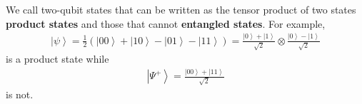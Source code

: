 \documentclass[11pt]{article} %
\newcommand{\ket}[1]{\left|#1\right\rangle}
\begin{document}
We call two-qubit states that can be written as the tensor product of two states \textbf{product states} and those that cannot \textbf{entangled states}. For example,
\begin{align}
    \ket{\psi} = \frac{1}{2}\left(\ket{00} + \ket{10} - \ket{01} - \ket{11}\right) = \frac{\ket{0} + \ket{1}}{\sqrt{2}} \otimes \frac{\ket{0} - \ket{1}}{\sqrt{2}}
\end{align}
is a product state while
\begin{align}
    \ket{\Psi^+} = \frac{\ket{00} + \ket{11}}{\sqrt{2}}
\end{align}
is not.
\end{document}
